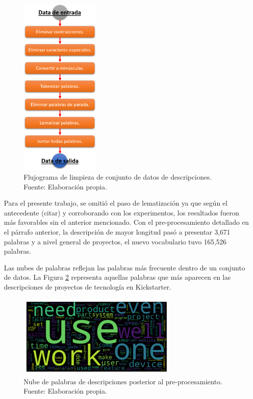 \begin{figure}[!ht]
	\begin{center}
		\includegraphics[width=0.35\textwidth]{4/figures/description_data_clean.png}
		\caption{Flujograma de limpieza de conjunto de datos de descripciones. Fuente: Elaboración propia.}
		\label{4:fig31}
	\end{center}
\end{figure}

Para el presente trabajo, se omitió el paso de lematización ya que según el antecedente (citar) y corroborando con los experimentos, los resultados fueron más favorables sin el anterior mencionado. Con el pre-procesamiento detallado en el párrafo anterior, la descripción de mayor longitud pasó a presentar 3,671 palabras y a nivel general de proyectos, el nuevo vocabulario tuvo 165,526 palabras.

Las nubes de palabras reflejan las palabras más frecuente dentro de un conjunto de datos. La Figura \ref{4:fig32} representa aquellas palabras que más aparecen en las descripciones de proyectos de tecnología en Kickstarter.

\begin{figure}[!ht]
	\begin{center}
		\includegraphics[width=0.7\textwidth]{4/figures/description_wordcloud.png}
		\caption{Nube de palabras de descripciones posterior al pre-procesamiento. Fuente: Elaboración propia.}
		\label{4:fig32}
	\end{center}
\end{figure}

